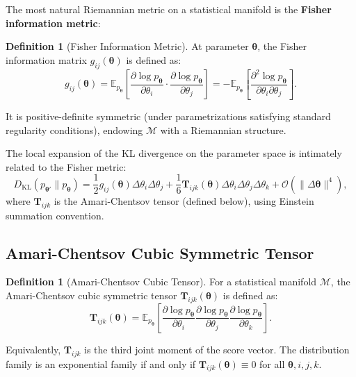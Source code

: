 \documentclass[12pt,a4paper]{article}
\theoremstyle{plain}
\theoremstyle{definition}
\newtheorem{definition}[theorem]{Definition}
\theoremstyle{remark}
\newcommand{\E}{\mathbb{E}}
\newcommand{\MM}{\mathcal{M}}
\newcommand{\DKL}{D_{\mathrm{KL}}}
\newcommand{\ACT}{\mathbf{T}}    %
\begin{document}
The most natural Riemannian metric on a statistical manifold is the \textbf{Fisher information metric}:

\begin{definition}[Fisher Information Metric]
\label{def:fisher_metric}
At parameter $\bm{\theta}$, the Fisher information matrix $g_{ij}(\bm{\theta})$ is defined as:
\begin{equation}\label{eq:fisher_metric_def}
    g_{ij}(\bm{\theta}) = \E_{p_{\bm{\theta}}}\left[\frac{\partial \log p_{\bm{\theta}}}{\partial \theta_i} \cdot \frac{\partial \log p_{\bm{\theta}}}{\partial \theta_j}\right]
    = -\E_{p_{\bm{\theta}}}\left[\frac{\partial^2 \log p_{\bm{\theta}}}{\partial \theta_i \partial \theta_j}\right].
\end{equation}

It is positive-definite symmetric (under parametrizations satisfying standard regularity conditions), endowing $\MM$ with a Riemannian structure.
\end{definition}

The local expansion of the KL divergence on the parameter space is intimately related to the Fisher metric:
\begin{equation}\label{eq:kl_expansion}
    \DKL(p_{\bm{\theta}'} \| p_{\bm{\theta}}) = \frac{1}{2} g_{ij}(\bm{\theta}) \Delta\theta_i \Delta\theta_j
    + \frac{1}{6} \ACT_{ijk}(\bm{\theta}) \Delta\theta_i \Delta\theta_j \Delta\theta_k + \mathcal{O}(\|\Delta\bm{\theta}\|^4),
\end{equation}
where $\ACT_{ijk}$ is the Amari-Chentsov tensor (defined below), using Einstein summation convention.

\subsection{Amari-Chentsov Cubic Symmetric Tensor}

\begin{definition}[Amari-Chentsov Cubic Tensor]
\label{def:AC_tensor}
For a statistical manifold $\MM$, the Amari-Chentsov cubic symmetric tensor $\ACT_{ijk}(\bm{\theta})$ is defined as:
\begin{equation}\label{eq:AC_tensor_def}
    \ACT_{ijk}(\bm{\theta}) = \E_{p_{\bm{\theta}}}\left[
        \frac{\partial \log p_{\bm{\theta}}}{\partial \theta_i}
        \frac{\partial \log p_{\bm{\theta}}}{\partial \theta_j}
        \frac{\partial \log p_{\bm{\theta}}}{\partial \theta_k}
    \right].
\end{equation}

Equivalently, $\ACT_{ijk}$ is the third joint moment of the score vector. The distribution family is an exponential family if and only if $\ACT_{ijk}(\bm{\theta}) \equiv 0$ for all $\bm{\theta}, i, j, k$.
\end{definition}
\end{document}
